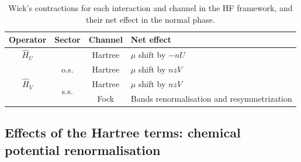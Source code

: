 \begin{table}[t]
	\centering
	\begin{tabular}{c c c l}
		\textbf{Operator} & \textbf{Sector} & \textbf{Channel} & \textbf{Net effect} \\
		\midrule
		$\hat H_U$ && Hartree & $\mu$ shift by $-nU$ \\
		\midrule
		\multirow{3}{*}{$\hat H_V$} & o.s. & Hartree & $\mu$ shift by $nzV$ \\[0.5em]
		 & \multirow{2}{*}{s.s.} & Hartree & $\mu$ shift by $nzV$\\
		&& Fock & Bands renormalisation and resymmetrization \\
		\midrule
	\end{tabular}
	\caption{Wick's contractions for each interaction and channel in the HF framework, and their net effect in the normal phase.}
	\label{tab:normal-RWCs}
\end{table}

\subsection{Effects of the Hartree terms: chemical potential renormalisation}\label{subsec:normal-hartree-mu}

